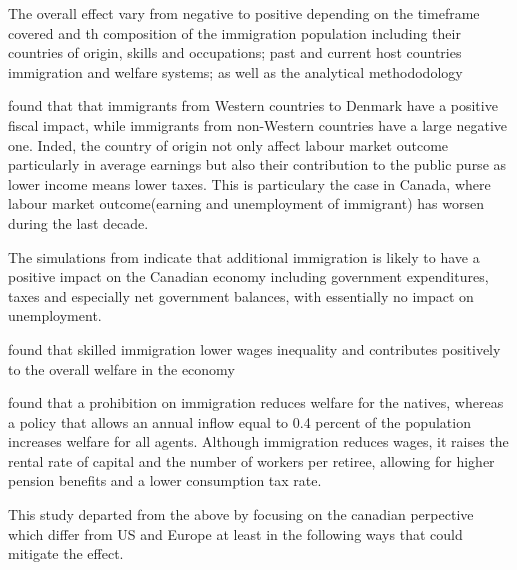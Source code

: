   The overall effect vary from negative to positive depending on the timeframe covered and th composition of the immigration population including their countries of origin\citep{Clarke:2013dh,Hansen:2017uz}, skills and occupations; past and current host countries immigration and welfare systems; as well as the analytical methododology


  \citep{Hansen:2017uz} found that that immigrants from Western countries to Denmark have a positive fiscal impact, while immigrants from non-Western countries have a large negative one. Inded, the country of origin not only affect labour market outcome particularly in average earnings \citep{Clarke:2013dh} but also their contribution to the public purse as lower income means lower taxes. This is particulary the case in Canada, where labour market outcome(earning and unemployment of immigrant) has worsen during the last decade.





  The simulations from \citep{Dungan:2013jp} indicate that additional immigration is likely to have a positive impact on the Canadian economy including government expenditures, taxes and especially net government balances, with essentially no impact on unemployment.

  \citep{Ileri:2019hf} found that skilled immigration lower wages inequality and contributes positively to the overall welfare in the economy





  \citep{Akin:gh} found that a prohibition on immigration reduces welfare for the natives, whereas a policy that allows an annual inflow equal to 0.4 percent of the population increases welfare for all agents. Although immigration reduces wages, it raises the rental rate of capital and the number of workers per retiree, allowing for higher pension benefits and a lower consumption tax rate.







  This study departed from the above by focusing on the canadian perpective which differ from US and Europe at least in the following ways that could mitigate the effect.

